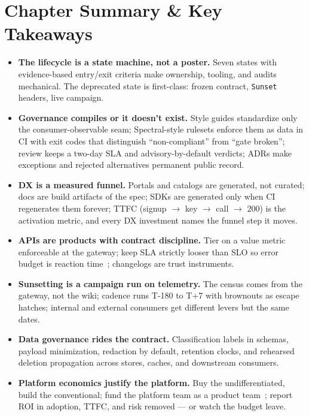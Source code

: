 \section{Chapter Summary \& Key Takeaways}
\label{sec:ch20-summary}

\begin{itemize}
  \item \textbf{The lifecycle is a state machine, not a poster.} Seven
        states with evidence-based entry/exit criteria make ownership,
        tooling, and audits mechanical. The \textsf{deprecated} state is
        first-class: frozen contract, \texttt{Sunset} headers, live
        campaign.
  \item \textbf{Governance compiles or it doesn't exist.} Style guides
        standardize only the consumer-observable seam; Spectral-style
        rulesets enforce them as data in CI with exit codes that
        distinguish ``non-compliant'' from ``gate broken''; review keeps
        a two-day SLA and advisory-by-default verdicts; ADRs make
        exceptions and rejected alternatives permanent public record.
  \item \textbf{DX is a measured funnel.} Portals and catalogs are
        generated, not curated; docs are build artifacts of the spec;
        SDKs are generated only when CI regenerates them forever; TTFC
        (signup $\rightarrow$ key $\rightarrow$ call $\rightarrow$ 200)
        is the activation metric, and every DX investment names the
        funnel step it moves.
  \item \textbf{APIs are products with contract discipline.} Tier on a
        value metric enforceable at the gateway; keep SLA strictly
        looser than SLO so error budget is reaction
        time~\cite{beyer2016sre}; changelogs are trust instruments.
  \item \textbf{Sunsetting is a campaign run on telemetry.} The census
        comes from the gateway, not the wiki; cadence runs T-180 to T+7
        with brownouts as escape hatches; internal and external consumers
        get different levers but the same dates.
  \item \textbf{Data governance rides the contract.} Classification
        labels in schemas, payload minimization, redaction by default,
        retention clocks, and rehearsed deletion propagation across
        stores, caches, and downstream consumers.
  \item \textbf{Platform economics justify the platform.} Buy the
        undifferentiated, build the conventional; fund the platform team
        as a product team~\cite{newman2021microservices}; report ROI in
        adoption, TTFC, and risk removed --- or watch the budget leave.
\end{itemize}

